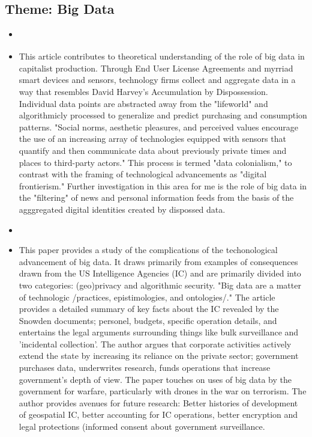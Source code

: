 \documentclass{article}
\begin{document}
\subsection{Theme: Big Data}
\begin{itemize}

\item \cite{thatcher2016DataColonialism}
\item This article contributes to theoretical understanding of the role of big data in capitalist production. Through End User License Agreements and myrriad smart devices and sensors, technology firms collect and aggregate data in a way that resembles David Harvey's Accumulation by Dispossession. Individual data points are abstracted away from the "lifeworld" and algorithmicly processed to generalize and predict purchasing and consumption patterns. "Social norms, aesthetic pleasures, and perceived values encourage the use of an increasing array of technologies equipped with sensors that quantify and then communicate data about previously private times and places to third-party actors." This process is termed "data colonialism," to contrast with the framing of technological advancements as "digital frontierism." Further investigation in this area for me is the role of big data in the "filtering" of news and personal information feeds from the basis of the agggregated digital identities created by dispossed data.

\item \cite{crampton2015CollectIt} 
\item This paper provides a study of the complications of the techonological advancement of big data. It draws primarily from examples of consequences drawn from the US Intelligence Agencies (IC) and are primarily divided into two categories: (geo)privacy and algorithmic security. "Big data are a matter of technologic /practices, epistimologies, and ontologies/." The article provides a detailed summary of key facts about the IC revealed by the Snowden documents; personel, budgets, specific operation details, and entertains the legal arguments surrounding things like bulk surveillance and 'incidental collection'. The author argues that corporate activities actively extend the state by increasing its reliance on the private sector; government purchases data, underwrites research, funds operations that increase government's depth of view. The paper touches on uses of big data by the government for warfare, particularly with drones in the war on terrorism. The author provides avenues for future research: Better histories of development of geospatial IC, better accounting for IC operations, better encryption and legal protections (informed consent about government surveillance.
  
\end{itemize}
\end{document}
